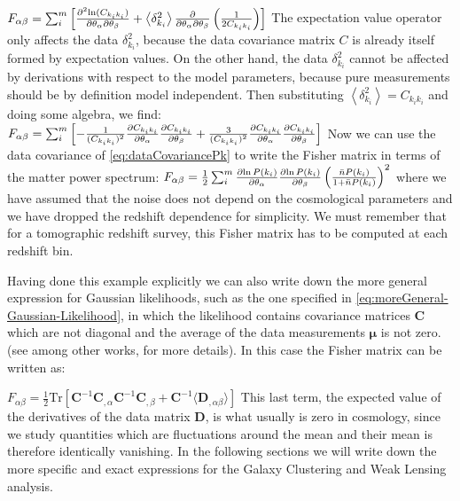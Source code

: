 \beeq$\label{eq:Fisher-fromloglik}
F_{\alpha \beta} = \sum_{i}^{m} \left[ \frac{\partial^2{\ln(C_{k_{i} k_{i}})}}{\partial{\theta_{\alpha}}\partial{\theta_{\beta}}} + 
\left\langle \delta^2_{k_i} \right\rangle \frac{\partial}{\partial{\theta_{\alpha}}\partial{\theta_{\beta}}}\left(\frac{1}{2  C_{k_{i} k_{i}}} \right) \right] 
$
The expectation value operator only affects the data $\delta^2_{k_i}$, because the data covariance matrix $C$ is 
already itself formed by expectation values. On the other hand, the data $\delta^2_{k_i}$ cannot be affected by
derivations with respect to the model parameters, because pure measurements should be by definition model independent.
Then substituting $\left\langle \delta^2_{k_i} \right\rangle = C_{k_{i} k_{i}}$
and doing some algebra, we find:
\beeqp$ \label{eq:Fisher-fromloglik-second}
F_{\alpha \beta} = \sum_{i}^{m} \left[-
 \frac{1}{(C_{k_{i} k_{i}})^2}\frac{\partial{C_{k_{i} k_{i}}}}{\partial{\theta_{\alpha}}}\frac{\partial{C_{k_{i} k_{i}}}}{\partial{\theta_{\beta}}}
+ \frac{3}{(C_{k_{i} k_{i}})^2}\frac{\partial{C_{k_{i} k_{i}}}}{\partial{\theta_{\alpha}}}\frac{\partial{C_{k_{i} k_{i}}}}{\partial{\theta_{\beta}}} \right] 
$
Now we can use the data covariance of \cref{eq:dataCovariancePk} to write the Fisher matrix in terms of the matter power
spectrum:
\beeqc$ \label{eq:Fisher-fromloglik-inPk}
F_{\alpha \beta} = \frac{1}{2}\sum_{i}^{m} 
 \frac{\partial{\ln P(k_i)}}{\partial{\theta_{\alpha}}}\frac{\partial{\ln P(k_i)}}{\partial{\theta_{\beta}}}
\left(  \frac{\bar{n} P(k_i)}{1+\bar{n} P(k_i)}  \right)^2
$
where we have assumed that the noise does not depend on the cosmological parameters and we have dropped
the redshift dependence for simplicity. We must remember that for a tomographic redshift survey,
this Fisher matrix has to be computed at each redshift bin.

Having done this example explicitly we can also write down the more general expression for Gaussian likelihoods, such as the one
specified in \cref{eq:moreGeneral-Gaussian-Likelihood}, in which
the likelihood contains covariance matrices $\bm C$ which are not diagonal and the average
of the data measurements $\bm \mu$ is not zero. (see \cite{cite Luca, Dodelson}
among other works, for more details). In this case the Fisher matrix can be written as:

\beeq$ \label{eq:Fisher-MatrixForm-GaussianGeneral}
F_{\alpha \beta} = \frac{1}{2}\mathrm{Tr}\left[\bm{C}^{-1}\bm{C}_{,\alpha}\bm{C}^{-1}\bm{C}_{,\beta}
+ \bm{C}^{-1}\langle \bm{D}_{,\alpha \beta} \rangle  
\right]
$
This last term, the expected value of the derivatives of the data matrix $\bm D$, is what usually is zero
in cosmology, since we study quantities which are fluctuations around the mean and their mean is therefore identically
vanishing.
In the following sections we will write down the more specific and exact expressions for 
the Galaxy Clustering and Weak Lensing analysis.

